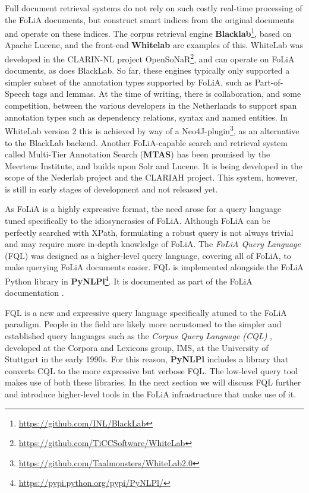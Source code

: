 \documentclass[a4paper,11pt]{article}
\begin{document}
Full document retrieval systems do not rely on such costly real-time processing
of the FoLiA documents, but construct smart indices from the original documents
and operate on these indices. The corpus retrieval engine
\textbf{Blacklab}\footnote{\url{https://github.com/INL/BlackLab}}, based on
Apache Lucene, and the front-end \textbf{Whitelab}
\cite{ReynaertVandecampVanzaanen2014ColingDemo} are examples of this. WhiteLab
was developed in the CLARIN-NL project
OpenSoNaR\footnote{\url{https://github.com/TiCCSoftware/WhiteLab}}, and can
operate on FoLiA documents, as does BlackLab. So far, these engines typically
only supported a simpler subset of the annotation types supported by FoLiA,
such as Part-of-Speech tags and lemmas.  At the time of writing, there is
collaboration, and some competition, between the various developers in the
Netherlands to support span annotation types such as dependency relations,
syntax and named entities. In WhiteLab version 2 this is achieved by way of a
Neo4J-plugin\footnote{\url{https://github.com/Taalmonsters/WhiteLab2.0}}, as an
alternative to the BlackLab backend. Another FoLiA-capable search and retrieval
system called Multi-Tier Annotation Search (\textbf{MTAS}) has been promised by
the Meertens Institute, and builds upon Solr and Lucene. It is being developed in
the scope of the Nederlab project \cite{Nederlab2016} and the CLARIAH project.
This system, however, is still in early stages of development and not released
yet.


As FoLiA is a highly expressive format, the need arose for a query language
tuned specifically to the idiosyncrasies of FoLiA. Although FoLiA can be
perfectly searched with XPath, formulating a robust query is not always trivial
and may require more in-depth knowledge of FoLiA. The \emph{FoLiA Query
Language} (FQL) was designed as a higher-level query language, covering all of
FoLiA, to make querying FoLiA documents easier. FQL is implemented alongside
the FoLiA Python library in
\textbf{PyNLPl}\footnote{\url{https://pypi.python.org/pypi/PyNLPl/}}. It is documented as part
of the FoLiA documentation \cite{FOLIADOC2014}.

FQL is a new and expressive query language specifically atuned to the FoLiA
paradigm. People in the field are likely more accustomed to the simpler and
established query languages such as the \emph{Corpus Query Language (CQL)}
\cite{CWB-Christ94}, developed at the Corpora and Lexicons group, IMS, at the
University of Stuttgart in the early 1990s. For this reason, \textbf{PyNLPl}
includes a library that converts CQL to the more expressive but verbose FQL.
The low-level query tool makes use of both these libraries. In the next section
we will discuss FQL further and introduce higher-level tools in the FoLiA
infrastructure that make use of it.
\end{document}
